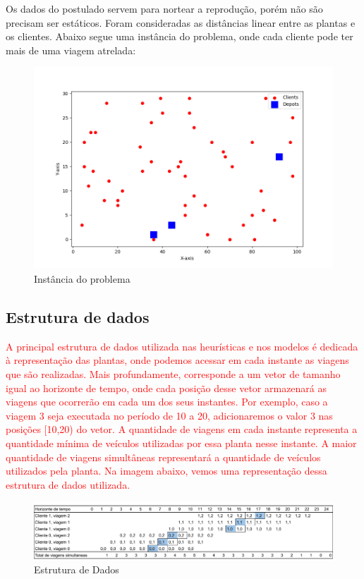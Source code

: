 Os dados do postulado servem para nortear a reprodução, porém não são precisam ser estáticos. Foram consideradas as distâncias linear entre as plantas e os clientes. Abaixo segue uma instância do problema, onde cada cliente pode ter mais de uma viagem atrelada:

\begin{figure}[H]
  \centering
  \includegraphics[width=\linewidth]{img/inst_1.png}
  \caption{Instância do problema}
  \label{fig:inst1}
\end{figure}

\subsection*{Estrutura de dados}
\label{subsec:estruturadosdados}
\textcolor{red}{A principal estrutura de dados utilizada nas heurísticas e nos modelos é dedicada à representação das plantas, onde podemos acessar em cada instante as viagens que são realizadas. Mais profundamente, corresponde a um vetor de tamanho igual ao horizonte de tempo, onde cada posição desse vetor armazenará as viagens que ocorrerão em cada um dos seus instantes. Por exemplo, caso a viagem 3 seja executada no período de 10 a 20, adicionaremos o valor 3 nas posições [10,20) do vetor. A quantidade de viagens em cada instante representa a quantidade mínima de veículos utilizadas por essa planta nesse instante. A maior quantidade de viagens simultâneas representará a quantidade de veículos utilizados pela planta. 
Na imagem abaixo, vemos uma representação dessa estrutura de dados utilizada.}

\begin{figure}[H] %
  \centering
  \includegraphics[width=1\textwidth]{img/estrutura de dados.pdf}
  \caption{Estrutura de Dados}
\end{figure}

